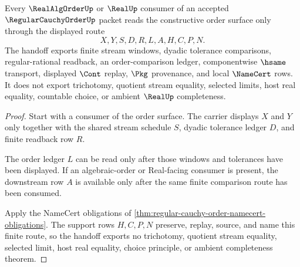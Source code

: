 \begin{theorem}
\label{thm:regular-cauchy-order-realalgorder-handoff}
Every $\RealAlgOrderUp$ or $\RealUp$ consumer of an accepted $\RegularCauchyOrderUp$ packet reads the constructive order surface only through the displayed route
$$
X,Y,S,D,R,L,A,H,C,P,N .
$$
The handoff exports finite stream windows, dyadic tolerance comparisons, regular-rational readback, an order-comparison ledger, componentwise $\hsame$ transport, displayed $\Cont$ replay, $\Pkg$ provenance, and local $\NameCert$ rows. It does not export trichotomy, quotient stream equality, selected limits, host real equality, countable choice, or ambient $\RealUp$ completeness.
\end{theorem}
\begin{proof}
Start with a consumer of the order surface. The carrier displays $X$ and $Y$ only together with the shared stream schedule $S$, dyadic tolerance ledger $D$, and finite readback row $R$.

The order ledger $L$ can be read only after those windows and tolerances have been displayed. If an algebraic-order or Real-facing consumer is present, the downstream row $A$ is available only after the same finite comparison route has been consumed.

Apply the NameCert obligations of \autoref{thm:regular-cauchy-order-namecert-obligations}. The support rows $H,C,P,N$ preserve, replay, source, and name this finite route, so the handoff exports no trichotomy, quotient stream equality, selected limit, host real equality, choice principle, or ambient completeness theorem.
\end{proof}




